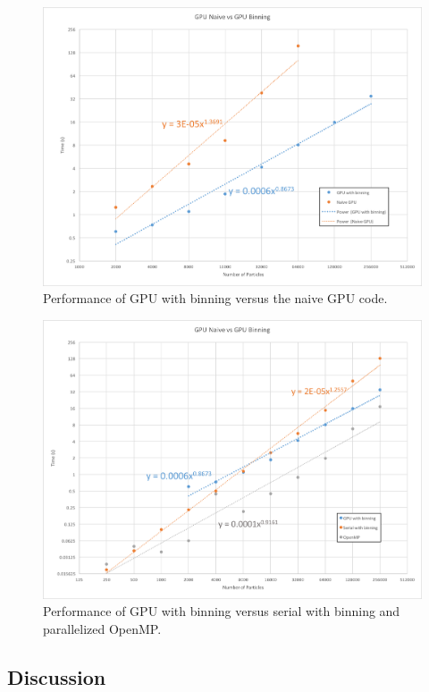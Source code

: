 \documentclass[12pt]{article}
\begin{document}

\begin{figure}
 \includegraphics[width=\textwidth]{graphs/gpu_binning_vs_gpu_serial.png}
  \caption{Performance of GPU with binning versus the naive GPU code.}
  \label{fig:gpu-naive}
\end{figure}

\begin{figure}
 \includegraphics[width=\textwidth]{graphs/serial_openmp_gpu.png}
  \caption{Performance of GPU with binning versus serial with binning and parallelized OpenMP.}
  \label{fig:gpu-compare}
\end{figure}

\subsection{Discussion}


%
\end{document}
